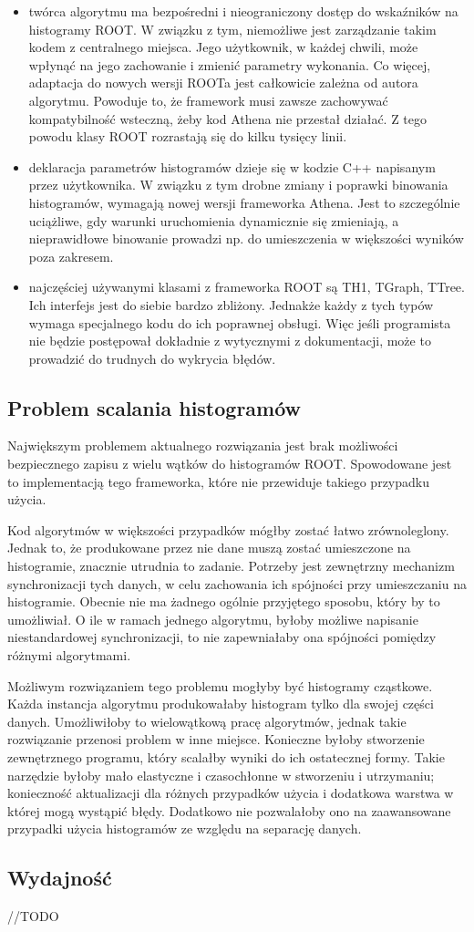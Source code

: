 \begin{itemize}
\item twórca algorytmu ma bezpośredni i nieograniczony dostęp do wskaźników na histogramy ROOT. 
W związku z tym, niemożliwe jest zarządzanie takim kodem z centralnego miejsca.
Jego użytkownik, w każdej chwili, może wpłynąć na jego zachowanie i zmienić parametry wykonania.
Co więcej, adaptacja do nowych wersji ROOTa jest całkowicie zależna od autora algorytmu. 
Powoduje to, że framework musi zawsze zachowywać kompatybilność wsteczną, żeby kod Athena nie przestał działać.
Z tego powodu klasy ROOT rozrastają się do kilku tysięcy linii.
\item deklaracja parametrów histogramów dzieje się w kodzie C++ napisanym przez użytkownika. 
W związku z tym drobne zmiany i poprawki binowania histogramów, wymagają nowej wersji frameworka Athena. 
Jest to szczególnie uciążliwe, gdy warunki uruchomienia dynamicznie się zmieniają, a nieprawidłowe binowanie prowadzi np. do umieszczenia w większości wyników poza zakresem.
\item najczęściej używanymi klasami z frameworka ROOT są TH1, TGraph, TTree. 
Ich interfejs jest do siebie bardzo zbliżony. 
Jednakże każdy z tych typów wymaga specjalnego kodu do ich poprawnej obsługi. 
Więc jeśli programista nie będzie postępował dokładnie z wytycznymi z dokumentacji, może to prowadzić do trudnych do wykrycia błędów. 
\end{itemize}

\subsection{Problem scalania histogramów}
Największym problemem aktualnego rozwiązania jest brak możliwości bezpiecznego zapisu z wielu wątków do histogramów ROOT.
Spowodowane jest to implementacją tego frameworka, które nie przewiduje takiego przypadku użycia. 

Kod algorytmów w większości przypadków mógłby zostać łatwo zrównoleglony.
Jednak to, że produkowane przez nie dane muszą zostać umieszczone na histogramie, znacznie utrudnia to zadanie.
Potrzeby jest zewnętrzny mechanizm synchronizacji tych danych, w celu zachowania ich spójności przy umieszczaniu na histogramie.
Obecnie nie ma żadnego ogólnie przyjętego sposobu, który by to umożliwiał.
O ile w ramach jednego algorytmu, byłoby możliwe napisanie niestandardowej synchronizacji, to nie zapewniałaby ona spójności pomiędzy różnymi algorytmami.

Możliwym rozwiązaniem tego problemu mogłyby być histogramy cząstkowe.
Każda instancja algorytmu produkowałaby histogram tylko dla swojej części danych.
Umożliwiłoby to wielowątkową pracę algorytmów, jednak takie rozwiązanie przenosi problem w inne miejsce. 
Konieczne byłoby stworzenie zewnętrznego programu, który scalałby wyniki do ich ostatecznej formy.
Takie narzędzie byłoby mało elastyczne i czasochłonne w stworzeniu i utrzymaniu; konieczność aktualizacji dla różnych przypadków użycia i dodatkowa warstwa w której mogą wystąpić błędy. 
Dodatkowo nie pozwalałoby ono na zaawansowane przypadki użycia histogramów ze względu na separację danych.

\subsection{Wydajność}
//TODO
